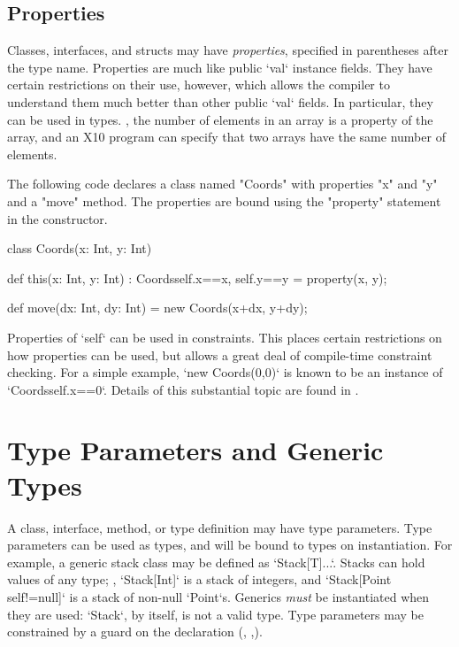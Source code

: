 \subsection{Properties}
\label{properties}

Classes, interfaces, and structs may have {\em properties}, specified in
parentheses after the type name. Properties are much like public \xcd`val`
instance fields. They have certain restrictions on their use, however, which
allows the compiler to understand them much better than other public \xcd`val`
fields. In particular, they can be used in types.  \Eg, the number of elements
in an array is a property of the array, and an X10 program can specify that
two arrays have the same number of elements.

\begin{ex}
The
following code declares a class named \xcd"Coords" with properties
\xcd"x" and \xcd"y" and a \xcd"move" method. The properties are bound
using the \xcd"property" statement in the constructor.

\begin{xten}
class Coords(x: Int, y: Int) { 
  def this(x: Int, y: Int) :
    Coords{self.x==x, self.y==y} = { 
    property(x, y); 
  } 

  def move(dx: Int, dy: Int) = new Coords(x+dx, y+dy); 
}
\end{xten}
\end{ex}

Properties of \xcd`self` can be used in constraints.  This places certain
restrictions on how properties can be used, but allows a great deal of
compile-time constraint checking.  For a simple example, 
\xcd`new Coords(0,0)` is known to be an instance of \xcd`Coords{self.x==0}`.  
Details of this substantial topic are
found in .



\section{Type Parameters and Generic Types}
\label{TypeParameters}

\label{Generics}

A class, interface, method, or type definition  may have type
parameters.  Type parameters can be used as types, and will be bound to types
on instantiation.  
For example, a generic stack class may be defined as 
\xcd`Stack[T]{...}`.  Stacks can hold values of any type; \eg, 
\xcd`Stack[Int]` is a stack of integers, and 
\xcd`Stack[Point {self!=null}]` is a stack of non-null \xcd`Point`s.
Generics {\em must} be instantiated when they are used: \xcd`Stack`, by
itself, is not a valid type.
Type parameters may be constrained by a guard on the declaration
(,
,).

